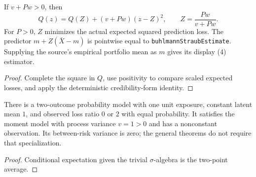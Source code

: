 \begin{theorem}\label{thm:bsStochasticMinimizer}\leanok
{}
If $v+Pw>0$, then
\[
 Q(z)=Q(Z)+(v+Pw)(z-Z)^2,
 \qquad Z=\frac{Pw}{v+Pw}.
\]
For $P>0$, $Z$ minimizes the actual expected squared prediction loss. The
predictor $m+Z(\bar X-m)$ is pointwise equal to
\texttt{buhlmannStraubEstimate}. Supplying the source's empirical portfolio
mean as $m$ gives its display (4) estimator.
\end{theorem}
\begin{proof}\leanok Complete the square in $Q$, use positivity to compare
scaled expected losses, and apply the deterministic credibility-form identity.\end{proof}

\begin{theorem}\label{thm:bsWitness}\leanok
{}
There is a two-outcome probability model with one unit exposure, constant
latent mean $1$, and observed loss ratio $0$ or $2$ with equal probability.
It satisfies the moment model with process variance $v=1>0$ and has a
nonconstant observation. Its between-risk variance is zero; the general
theorems do not require that specialization.
\end{theorem}
\begin{proof}\leanok Conditional expectation given the trivial
$\sigma$-algebra is the two-point average.\end{proof}
